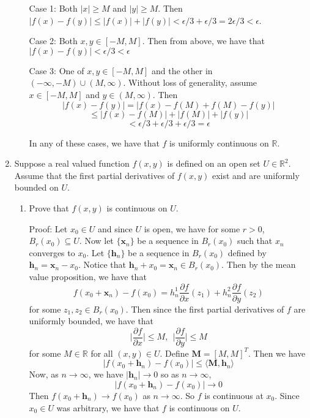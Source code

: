 \documentclass{article}
\begin{document}
\begin{enumerate}
\begin{enumerate}
        Case 1: Both $|x| \geq M$ and $|y| \geq M$. Then $|f(x) - f(y)| \leq |f(x)| + |f(y)| < \epsilon/3 + \epsilon/3 = 2\epsilon/3 < \epsilon$.
        \newline
        
        Case 2: Both $x,y \in [-M,M]$. Then from above, we have that $|f(x) - f(y)| < \epsilon/3 < \epsilon$
        \newline
        
        Case 3: One of $x,y \in [-M, M]$ and the other in $(-\infty, -M) \cup (M, \infty)$. Without loss of generality, assume $x \in [-M,M]$ and $y \in (M, \infty)$. Then
        \[|f(x) - f(y)| = |f(x) - f(M) + f(M) - f(y)|\]
        \[\leq |f(x) - f(M)| + |f(M)| + |f(y)|\]
        \[< \epsilon/3 + \epsilon/3 + \epsilon/3 = \epsilon\]
        \newline
        
        In any of these cases, we have that $f$ is uniformly continuous on $\mathbb{R}$.
        
    \end{enumerate}
    
    \item Suppose a real valued function $f(x,y)$ is defined on an open set $U \in \mathbb{R}^2$. Assume that the first partial derivatives of $f(x,y)$ exist and are uniformly bounded on $U$. 
    \begin{enumerate}
        \item Prove that $f(x,y)$ is continuous on $U$.
        \newline
        
        Proof: Let $x_0 \in U$ and since $U$ is open, we have for some $r > 0$, $B_r(x_0) \subseteq U$. Now let $\{\textbf{x}_n\}$ be a sequence in $B_r(x_0)$ such that $x_n$ converges to $x_0$. Let $\{\textbf{h}_n\}$ be a sequence in $B_r(x_0)$ defined by $\textbf{h}_n = \textbf{x}_n - x_0$. Notice that $\textbf{h}_n + x_0 = \textbf{x}_n \in B_r(x_0)$. Then by the mean value proposition, we have that
        \[f(x_0 + \textbf{x}_n) - f(x_0) = h_n^1 \frac{\partial f}{\partial x}(z_1) + h_n^2\frac{\partial f}{\partial y}(z_2)\]
        for some $z_1, z_2 \in B_r(x_0)$. Then since the first partial derivatives of $f$ are uniformly bounded, we have that 
        \[\bigg| \frac{\partial f}{\partial x}\bigg| \leq M, \:\: \bigg| \frac{\partial f}{\partial y} \bigg| \leq M\]
        for some $M \in \mathbb{R}$ for all $(x,y) \in U$. Define $\textbf{M} = [M, M]^T$. Then we have 
        \[|f(x_0 + \textbf{h}_n) - f(x_0)| \leq \langle \textbf{M}, \textbf{h}_n \rangle\]
        Now, as $n \to \infty$, we have $|\textbf{h}_n| \to 0$ so as $n \to \infty$,
        \[|f(x_0 + \textbf{h}_n) - f(x_0)| \to 0\]
        Then $f(x_0 + \textbf{h}_n) \to f(x_0)$ as $n \to \infty$. So $f$ is continuous at $x_0$. Since $x_0 \in U$ was arbitrary, we have that $f$ is continuous on $U$.
        

\end{enumerate}
\end{enumerate}
\end{document}
